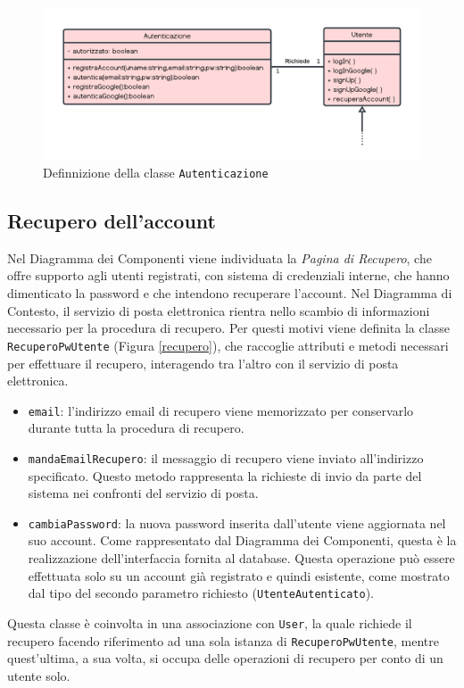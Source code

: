 \documentclass[11pt, a4paper]{article}
\theoremstyle{definition} %
\begin{document}
\begin{figure}[H]
\centering
\hspace*{-1.5cm}
\includegraphics[scale = 0.9]{materiale/class-autenticazione.pdf}
\caption{Definnizione della classe \texttt{Autenticazione}}
\label{autenticaz}
\end{figure}


\subsection{Recupero dell'account}
Nel Diagramma dei Componenti viene individuata la \textit{Pagina di Recupero},
che offre supporto agli utenti registrati, con sistema di credenziali interne,
che hanno dimenticato la password e che intendono recuperare l'account.
Nel Diagramma di Contesto, il servizio di posta elettronica rientra nello
scambio di informazioni necessario per la procedura di recupero. Per
questi motivi viene definita la classe \texttt{RecuperoPwUtente} (Figura \ref{recupero}), che
raccoglie attributi e metodi necessari per effettuare il recupero,
interagendo tra l'altro con il servizio di posta elettronica.

\begin{itemize}
    \item \texttt{email}: l'indirizzo email di recupero viene memorizzato
    per conservarlo durante tutta la procedura di recupero.

    \item \texttt{mandaEmailRecupero}: il messaggio di recupero viene inviato
    all'indirizzo specificato. Questo metodo rappresenta la richieste di
    invio da parte del sistema nei confronti del servizio di posta.

    \item \texttt{cambiaPassword}: la nuova password inserita dall'utente
    viene aggiornata nel suo account. Come rappresentato dal Diagramma dei
    Componenti, questa è la realizzazione dell'interfaccia fornita al
    database. Questa operazione può essere effettuata solo su un account
    già registrato e quindi esistente, come mostrato dal tipo del secondo
    parametro richiesto (\texttt{UtenteAutenticato}).
\end{itemize}
Questa classe è coinvolta in una associazione con \texttt{User}, la quale
richiede il recupero facendo riferimento ad una sola istanza di
\texttt{RecuperoPwUtente}, mentre quest'ultima, a sua volta, si occupa
delle operazioni di recupero per conto di un utente solo.
\end{document}
